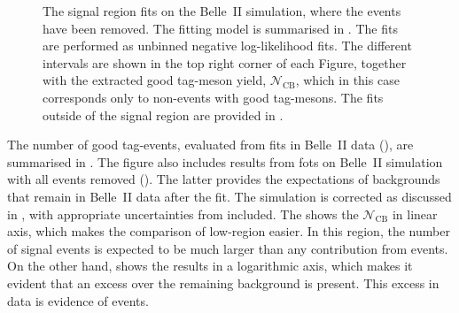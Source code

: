 \begin{figure}[htbp!]
{    }
    \caption{\label{fig:nosignal_fits_signal}
    The \EB signal region fits on the Belle~II simulation, where the \BtoXsdgamma events have been removed.
    The fitting model is summarised in .
    The fits are performed as unbinned negative log-likelihood fits.
    The different \EB intervals are shown in the top right corner of each Figure, 
    together with the extracted good tag-\B meson yield, $\mathcal{N}_{\mathrm{CB}}$, which in this case corresponds only to non-\BtoXsdgamma events with good tag-\B mesons.
    The fits outside of the signal region are provided in .
    }
\end{figure}

The number of good tag-\B events, evaluated from fits in Belle~II data (),
are summarised in .
The figure also includes results from fots on Belle~II simulation with all \BtoXsgamma events removed ().
The latter provides the expectations of \BB backgrounds that remain in Belle~II data after the fit.
The simulation is corrected as discussed in , with appropriate uncertainties from  included.
The  shows the $\mathcal{N}_{\mathrm{CB}}$ in linear axis, which makes the comparison of low-\EB region easier. 
In this region, the number of signal events is expected to be much larger than any contribution from \BtoXsgamma events.
On the other hand,  shows the results in a logarithmic axis, which makes it evident that an excess over the remaining \BB background is present.
This excess in data is evidence of \BtoXsdgamma events.

